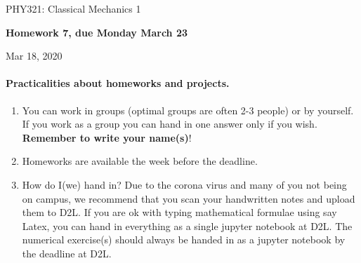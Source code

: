 \documentclass[%
oneside,                 %
final,                   %
10pt]{article}
\begin{document}

\newcommand{\exercisesection}[1]{\subsection*{#1}}






\thispagestyle{empty}

\begin{center}
{\LARGE\bf
\begin{spacing}{1.25}
PHY321: Classical Mechanics 1
\end{spacing}
}
\end{center}


\begin{center}
{\bf Homework 7, due Monday  March 23${}^{}$} \\ [0mm]
\end{center}

\begin{center}
\end{center}
    

\begin{center}
Mar 18, 2020
\end{center}

\vspace{1cm}


\paragraph{Practicalities about  homeworks and projects.}
\begin{enumerate}
\item You can work in groups (optimal groups are often 2-3 people) or by yourself. If you work as a group you can hand in one answer only if you wish. \textbf{Remember to write your name(s)}!

\item Homeworks are available  the week before the deadline. 

\item How do I(we)  hand in?  Due to the corona virus and many of you not being on campus, we recommend that you scan your handwritten notes and upload them to D2L. If you are ok with typing mathematical formulae using say Latex, you can hand in everything as a single jupyter notebook at D2L. The numerical exercise(s) should always be handed in as a jupyter notebook by the deadline at D2L. 
\end{enumerate}
\end{document}
